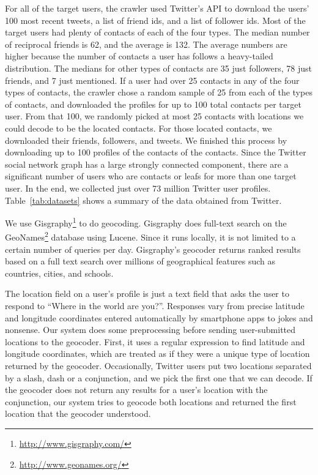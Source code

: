 
For all of the target users, the crawler used Twitter's API to download
the users' 100 most recent tweets, a list of friend ids, and a list of follower ids.
%
Most of the target users had plenty of contacts of each of the four types.
%
The median number of reciprocal friends is 62, and the average is 132.
%
The average numbers are higher because the number of contacts a user has
follows a heavy-tailed distribution.
%
The medians for other types of contacts are 35 just followers, 78 just friends,
and 7 just mentioned.
%
If a user had over 25 contacts in any of the four types of contacts, the
crawler chose a random sample of 25 from each of the types of contacts, and
downloaded the profiles for up to 100 total contacts per target user.
%
From that 100, we randomly picked at most 25 contacts with locations we could
decode to be the located contacts. For those located contacts, we downloaded
their friends, followers, and tweets.
%
We finished this process by downloading up to 100 profiles of the contacts of
the contacts.
%
Since the Twitter social network graph has a large strongly connected
component, there are a significant number of users who are contacts or leafs for
more than one target user.
%
In the end, we collected just over 73 million Twitter user profiles.
%
Table~\ref{tab:datasets} shows a summary of the data obtained from Twitter.

We use Gisgraphy\footnote{\url{http://www.gisgraphy.com/}} to do geocoding.
%
Gisgraphy does full-text search on the
GeoNames\footnote{\url{http://www.geonames.org/}} database using Lucene.
%
Since it runs locally, it is not limited to a certain number of queries per day.
%
Gisgraphy's geocoder returns ranked results based on a full text search
over millions of geographical features such as countries, cities, and schools.

The location field on a user's profile is just a text field that asks the user
to respond to ``Where in the world are you?''.
%
Responses vary from precise latitude and longitude coordinates entered
automatically by smartphone apps to jokes and nonsense.
%
Our system does some preprocessing before sending user-submitted locations to
the geocoder.
%
First, it uses a regular expression to find latitude and longitude coordinates,
which are treated as if they were a unique type of location returned by the
geocoder.
%
Occasionally, Twitter users put two locations separated by a slash, dash or a
conjunction, and we pick the first one that we can decode.
%
If the geocoder does not return any results for a user's location with the
conjunction, our system tries to geocode both locations and returned the first
location that the geocoder understood.


